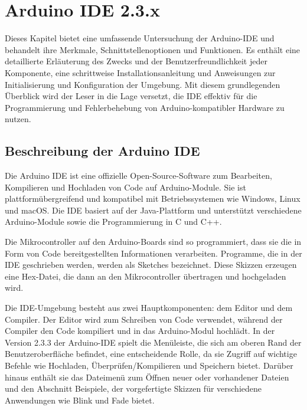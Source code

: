 %
%
%


\chapter{Arduino IDE 2.3.x}\label{ArduinoIDE2}



Dieses Kapitel bietet eine umfassende Untersuchung der Arduino-IDE und behandelt ihre Merkmale, Schnittstellenoptionen und Funktionen. Es enthält eine detaillierte Erläuterung des Zwecks und der Benutzerfreundlichkeit jeder Komponente, eine schrittweise Installationsanleitung und Anweisungen zur Initialisierung und Konfiguration der Umgebung. Mit diesem grundlegenden Überblick wird der Leser in die Lage versetzt, die IDE effektiv für die Programmierung und Fehlerbehebung von Arduino-kompatibler Hardware zu nutzen.




\section{Beschreibung der Arduino IDE}\label{ArduinoIDE}

Die Arduino IDE ist eine offizielle Open-Source-Software zum Bearbeiten, Kompilieren und Hochladen von Code auf Arduino-Module. Sie ist plattformübergreifend und kompatibel mit Betriebssystemen wie Windows, Linux und macOS. Die IDE basiert auf der Java-Plattform und unterstützt verschiedene Arduino-Module sowie die Programmierung in C und C++.

Die Mikrocontroller auf den Arduino-Boards sind so programmiert, dass sie die in Form von Code bereitgestellten Informationen verarbeiten. Programme, die in der IDE geschrieben werden, werden als Sketches bezeichnet. Diese Skizzen erzeugen eine Hex-Datei, die dann an den Mikrocontroller übertragen und hochgeladen wird.

Die IDE-Umgebung besteht aus zwei Hauptkomponenten: dem Editor und dem Compiler. Der Editor wird zum Schreiben von Code verwendet, während der Compiler den Code kompiliert und in das Arduino-Modul hochlädt.\cite{Fezari:2018} In der Version 2.3.3 der Arduino-IDE spielt die Menüleiste, die sich am oberen Rand der Benutzeroberfläche befindet, eine entscheidende Rolle, da sie Zugriff auf wichtige Befehle wie Hochladen, Überprüfen/Kompilieren und Speichern bietet. Darüber hinaus enthält sie das Dateimenü zum Öffnen neuer oder vorhandener Dateien und den Abschnitt Beispiele, der vorgefertigte Skizzen für verschiedene Anwendungen wie Blink und Fade bietet.






